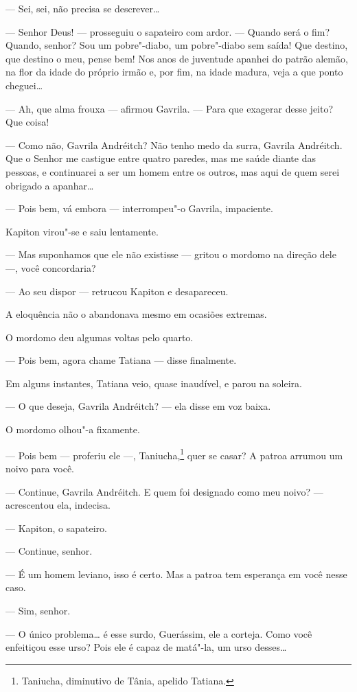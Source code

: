 --- Sei, sei, não precisa se descrever\ldots{}

--- Senhor Deus! --- prosseguiu o sapateiro com ardor. --- Quando será o
fim? Quando, senhor? Sou um pobre"-diabo, um pobre"-diabo sem saída! Que
destino, que destino o meu, pense bem! Nos anos de juventude apanhei do
patrão alemão, na flor da idade do próprio irmão e, por fim, na idade
madura, veja a que ponto cheguei\ldots{}

--- Ah, que alma frouxa --- afirmou Gavrila. --- Para que exagerar desse
jeito? Que coisa!

--- Como não, Gavrila Andréitch? Não tenho medo da surra, Gavrila
Andréitch. Que o Senhor me castigue entre quatro paredes, mas me saúde
diante das pessoas, e continuarei a ser um homem entre os outros, mas
aqui de quem serei obrigado a apanhar\ldots{}

--- Pois bem, vá embora --- interrompeu"-o Gavrila, impaciente.

Kapiton virou"-se e saiu lentamente.

--- Mas suponhamos que ele não existisse --- gritou o mordomo na direção
dele ---, você concordaria?

--- Ao seu dispor --- retrucou Kapiton e desapareceu.

A eloquência não o abandonava mesmo em ocasiões extremas.

O mordomo deu algumas voltas pelo quarto.

--- Pois bem, agora chame Tatiana --- disse finalmente.

Em alguns instantes, Tatiana veio, quase inaudível, e parou na soleira.

--- O que deseja, Gavrila Andréitch? --- ela disse em voz baixa.

O mordomo olhou"-a fixamente.

--- Pois bem --- proferiu ele ---, Taniucha,\footnote{Taniucha,
  diminutivo de Tânia, apelido Tatiana.} quer se casar? A patroa arrumou um noivo para
você.

--- Continue, Gavrila Andréitch. E quem foi designado como meu noivo?
--- acrescentou ela, indecisa.

--- Kapiton, o sapateiro.

--- Continue, senhor.

--- É um homem leviano, isso é certo. Mas a patroa tem esperança em você
nesse caso.

--- Sim, senhor.

--- O único problema\ldots{} é esse surdo, Guerássim, ele a corteja. Como
você enfeitiçou esse urso? Pois ele é capaz de matá"-la, um urso
desses\ldots{}

